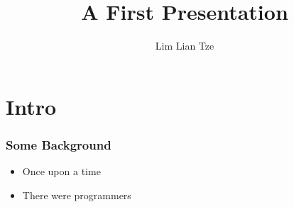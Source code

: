 \documentclass{beamer}
\author{Lim Lian Tze}
\title{A First Presentation}
\begin{document}
\frame[t,plain]{\titlepage}

\section{Intro}

\begin{frame}
\frametitle{Some Background}
\begin{itemize}
\item Once upon a time
\item There were programmers
\end{itemize}
\end{frame}
\end{document}
